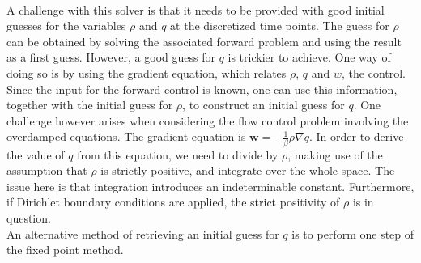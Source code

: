 \documentclass[11pt, a4paper]{article}
\theoremstyle{definition}
\newcommand{\adj}{q}
\begin{document}
\\
A challenge with this solver is that it needs to be provided with good initial guesses for the variables $\rho$ and $\adj$ at the discretized time points. The guess for $\rho$ can be obtained by solving the associated forward problem and using the result as a first guess. However, a good guess for $\adj$ is trickier to achieve. One way of doing so is by using the gradient equation, which relates $\rho$, $\adj$ and $w$, the control. Since the input for the forward control is known, one can use this information, together with the initial guess for $\rho$, to construct an initial guess for $\adj$. 
One challenge however arises when considering the flow control problem involving the overdamped equations. The gradient equation is $\mathbf{w} = - \frac{1}{\beta} \rho\nabla \adj$. In order to derive the value of $\adj$ from this equation, we need to divide by $\rho$, making use of the assumption that $\rho$ is strictly positive, and integrate over the whole space. The issue here is that integration introduces an indeterminable constant. Furthermore, if Dirichlet boundary conditions are applied, the strict positivity of $\rho$ is in question.\\
An alternative method of retrieving an initial guess for $\adj$ is to perform one step of the fixed point method.
\end{document}
